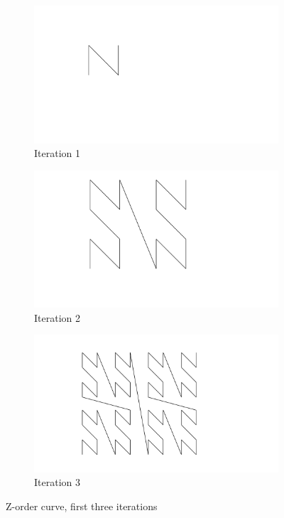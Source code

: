 \begin{figure}[ht]
     \centering
     \begin{subfigure}{0.2\textwidth}
         \centering
         \includegraphics[width=\textwidth]{figures/spaceFilling_z_1.pdf}
         \caption{Iteration 1}
     \end{subfigure}
     \hfill
      \begin{subfigure}{0.2\textwidth}
     \centering
     \includegraphics[width=\textwidth]{figures/spaceFilling_z_2.pdf}
     \caption{Iteration 2}
     \end{subfigure}
    \hfill
     \begin{subfigure}{0.2\textwidth}
         \centering
         \includegraphics[width=\textwidth]{figures/spaceFilling_z_3.pdf}
         \caption{Iteration 3}
     \end{subfigure}
        \caption{Z-order curve, first three iterations}
        \label{fig:zorder}
\end{figure}

